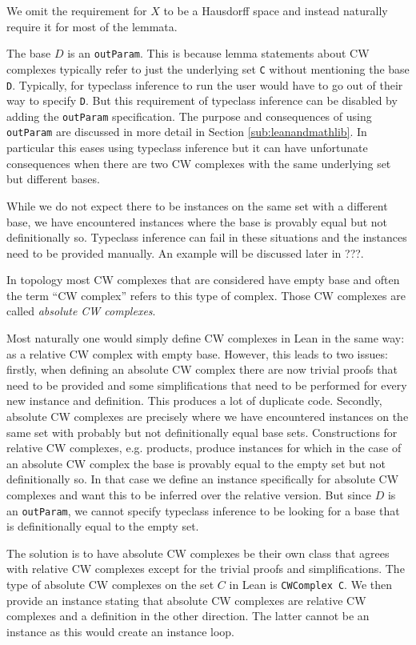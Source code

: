 We omit the requirement for $X$ to be a Hausdorff space and instead naturally require it for most of the lemmata. 

The base $D$ is an \lstinline|outParam|. 
This is because lemma statements about CW complexes typically refer to just the underlying set \lstinline|C| without mentioning the base \lstinline|D|. 
Typically, for typeclass inference to run the user would have to go out of their way to specify \lstinline|D|. 
But this requirement of typeclass inference can be disabled by adding the \lstinline|outParam| specification.
The purpose and consequences of using \lstinline|outParam| are discussed in more detail in Section \ref{sub:leanandmathlib}.
In particular this eases using typeclass inference but it can have unfortunate consequences when there are two CW complexes with the same underlying set but different bases.

While we do not expect there to be instances on the same set with a different base, we have encountered instances where the base is provably equal but not definitionally so. 
Typeclass inference can fail in these situations and the instances need to be provided manually. 
An example will be discussed later in ???. 

In topology most CW complexes that are considered have empty base and often the term ``CW complex'' refers to this type of complex. 
Those CW complexes are called \emph{absolute CW complexes}. 

Most naturally one would simply define CW complexes in Lean in the same way: as a relative CW complex with empty base.
However, this leads to two issues: 
firstly, when defining an absolute CW complex there are now trivial proofs that need to be provided and some simplifications that need to be performed for every new instance and definition. 
This produces a lot of duplicate code. 
Secondly, absolute CW complexes are precisely where we have encountered instances on the same set with probably but not definitionally equal base sets. 
Constructions for relative CW complexes, e.g. products, produce instances for which in the case of an absolute CW complex the base is provably equal to the empty set but not definitionally so. 
In that case we define an instance specifically for absolute CW complexes and want this to be inferred over the relative version. 
But since $D$ is an \lstinline|outParam|, we cannot specify typeclass inference to be looking for a base that is definitionally equal to the empty set. 

The solution is to have absolute CW complexes be their own class that agrees with relative CW complexes except for the trivial proofs and simplifications. 
The type of absolute CW complexes on the set $C$ in Lean is \lstinline|CWComplex C|. 
We then provide an instance stating that absolute CW complexes are relative CW complexes and a definition in the other direction.
The latter cannot be an instance as this would create an instance loop. 



